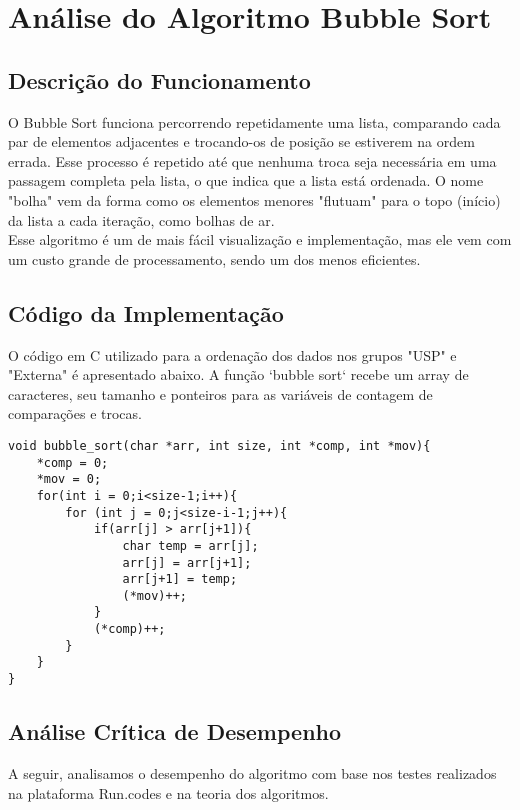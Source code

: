 
\section{Análise do Algoritmo Bubble Sort}

\subsection{Descrição do Funcionamento}
O Bubble Sort funciona percorrendo repetidamente uma lista, comparando cada par de elementos adjacentes e trocando-os de posição se estiverem na ordem errada. Esse processo é repetido até que nenhuma troca seja necessária em uma passagem completa pela lista, o que indica que a lista está ordenada. O nome "bolha" vem da forma como os elementos menores "flutuam" \space para o topo (início) da lista a cada iteração, como bolhas de ar. \\
Esse algoritmo é um de mais fácil visualização e implementação, mas ele vem com um custo grande de processamento, sendo um dos menos eficientes.

\subsection{Código da Implementação}
O código em C utilizado para a ordenação dos dados nos grupos "USP" e "Externa" é apresentado abaixo. A função `bubble sort` recebe um array de caracteres, seu tamanho e ponteiros para as variáveis de contagem de comparações e trocas.

\begin{lstlisting}[style=CStyle, caption={Função bubble\_sort implementada em C.}, label={lst:bubble}]
void bubble_sort(char *arr, int size, int *comp, int *mov){
    *comp = 0;
    *mov = 0;
    for(int i = 0;i<size-1;i++){
        for (int j = 0;j<size-i-1;j++){
            if(arr[j] > arr[j+1]){
                char temp = arr[j];
                arr[j] = arr[j+1];
                arr[j+1] = temp;
                (*mov)++;
            }
            (*comp)++;
        }
    }
}
\end{lstlisting}

\subsection{Análise Crítica de Desempenho}
A seguir, analisamos o desempenho do algoritmo com base nos testes realizados na plataforma Run.codes e na teoria dos algoritmos.

